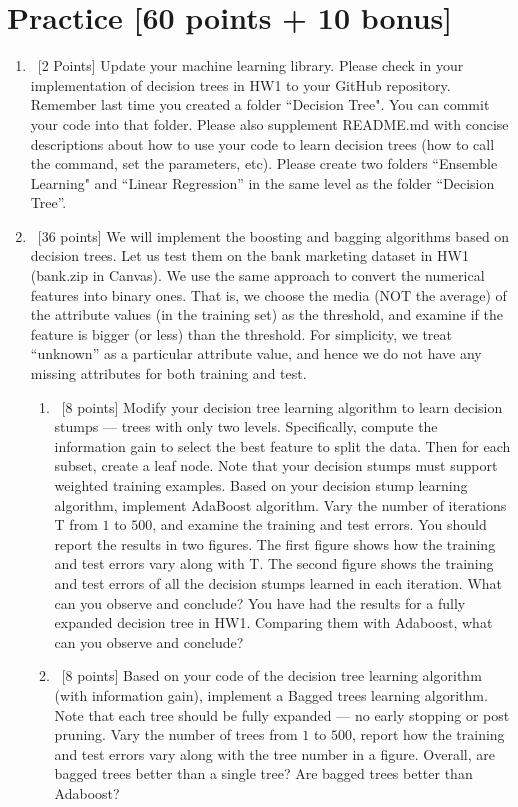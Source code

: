 \documentclass[12pt, fullpage,letterpaper]{article}
\begin{document}
\section{Practice [60 points + 10 bonus]}
\begin{enumerate}
	\item~[2 Points] Update your machine learning library. Please check in your implementation of decision trees in HW1 to your GitHub repository. Remember last time you created a folder ``Decision Tree". You can commit your code into that folder. Please also supplement README.md with concise descriptions about how to use your code to learn decision trees (how to call the command, set the parameters, etc). Please create two folders ``Ensemble Learning" and ``Linear Regression''  in the same level as the folder ``Decision Tree''.  


\item~[36 points] We will implement the boosting and bagging algorithms based on decision trees.  Let us test them on the bank marketing dataset in HW1 (bank.zip in Canvas). We use the same approach to convert the numerical features into binary ones. That is, we choose the media (NOT the average) of the attribute values (in the training set) as the threshold, and examine if the feature is bigger (or less) than the threshold.  For simplicity, we treat ``unknown'' as a particular attribute value, and hence we do not have any missing attributes for both training and test.
\begin{enumerate}
	\item~[8 points] Modify your decision tree learning algorithm to learn decision stumps ---  trees with only two levels. Specifically, compute the information gain to select the best feature to split the data. Then for each subset, create a leaf node. Note that your decision stumps must support weighted training examples. Based on your decision stump learning algorithm, implement AdaBoost algorithm. Vary the number of iterations T from $1$ to $500$, and examine the training and test errors. You should report the results in two figures. The first figure shows how the training and test errors vary along with T. The second figure shows  the training and test errors of all the decision stumps learned in each iteration. What can you observe and conclude? You have had the results for a fully expanded decision tree in HW1. Comparing them with Adaboost, what can you observe and conclude?
	
	\item~[8 points] Based on your code of the decision tree learning algorithm (with information gain), implement a Bagged trees learning algorithm. Note that each tree should be fully expanded --- no early stopping or post pruning. Vary the number of trees from $1$ to $500$, report how the training and test errors vary along with the tree number in a figure. Overall, are bagged trees better than a single tree? Are bagged trees better than Adaboost? 


\end{enumerate}
\end{enumerate}
\end{document}
